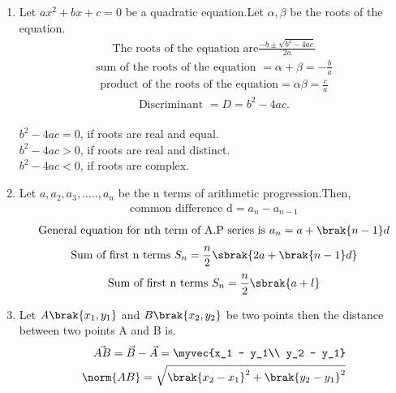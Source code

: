 
\begin{enumerate}[label=\thesubsection.\arabic*, ref=\thesubsection.\theenumi]
\item
Let $ax^2 + bx + c =0$ be a quadratic equation.Let $\alpha ,\beta$ be the roots of the equation.
\begin{align}
\text{The roots of the equation are} \frac{-b \pm \sqrt{b^2 - 4ac}}{2a}\label{eq:EE26BTECH11211-Prob_1.1.10}
\end{align}
\begin{align}
\text{sum of the roots of the equation }= \alpha + \beta = -\frac{b}{a}\label{eq:EE26BTECH11211-Prob_1.2.10}
\end{align}
\begin{align}
\text{product of the roots of the equation}= \alpha\beta=\frac{c}{a}\label{eq:EE26BTECH11211-Prob_1.3.10}
\end{align}
\begin{align}
\text{Discriminant }= D =b^2 - 4ac.\label{eq:EE26BTECH11211-Prob_1.4.10}
\end{align}
\\$b^2 - 4ac = 0$, if roots are real and equal. 
\\$b^2 - 4ac > 0$, if roots are real and distinct.
\\$b^2 - 4ac < 0$, if roots are complex.

\item
Let $a,a_2,a_3,.....,a_n$ be the n terms of arithmetic progression.Then,
\begin{align}
\text{common difference d}=a_n - a_{n-1}
\end{align}
\begin{align}
\text{General equation for nth term of A.P series is } a_n = a + \brak{n-1}d\label{eq:EE26BTECH11211-Prob_2.2.10}
\end{align}
\begin{align}
\text{Sum of first n terms } S_n = \frac{n}{2}\sbrak{2a + \brak{n-1}d}\label{eq:EE26BTECH11211-Prob_2.3.10}
\end{align}
\begin{align}
\text{Sum of first n terms } S_n = \frac{n}{2}\sbrak{a + l} \label{eq:EE26BTECH11211-Prob_2.4.10}
\end{align}
\item
Let $A\brak{x_1,y_1}$ and $B\brak{x_2,y_2}$ be two points then the distance between two points A and B is.
\begin{align}
\vec{AB} = \vec{B} - \vec{A} = \myvec{x_1 - y_1\\ y_2  - y_1}\\ 
\norm{AB} = \sqrt{\brak{x_2 - x_1}^2 + \brak{y_2 - y_1}^2} \label{eq:EE26BTECH11211-Prob_3.10}
\end{align}


\end{enumerate}
